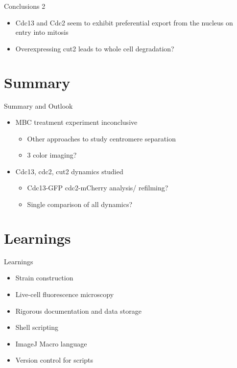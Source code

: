 \begin{frame}{Conclusions 2}
\begin{itemize}
\item Cdc13 and Cdc2 seem to exhibit preferential export from the nucleus on entry into mitosis
\item Overexpressing cut2 leads to whole cell degradation?
\end{itemize}
\end{frame}

\section{Summary}

\begin{frame}{Summary and Outlook}
\begin{itemize}
	\item MBC treatment experiment inconclusive
		\begin{itemize}
		\item Other approaches to study centromere separation
		\item 3 color imaging?
		\end{itemize}
	\item Cdc13, cdc2, cut2 dynamics studied
		\begin{itemize}
		\item Cdc13-GFP cdc2-mCherry analysis/ refilming? 
		\item Single comparison of all dynamics?
		\end{itemize}
\end{itemize}
\end{frame}

\section{Learnings}
\begin{frame}{Learnings}
\begin{itemize}
\item Strain construction
\item Live-cell fluorescence microscopy
\item Rigorous documentation and data storage
\item Shell scripting
\item ImageJ Macro language
\item Version control for scripts
\end{itemize}
\end{frame}
 
